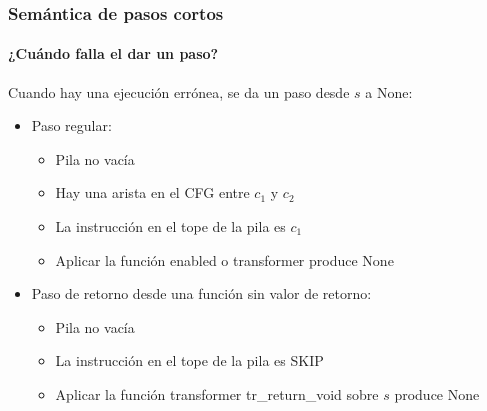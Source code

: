 \begin{frame}
\frametitle{Semántica de pasos cortos}
\framesubtitle{¿Cuándo falla el dar un paso?}

Cuando hay una ejecución errónea, se da un paso desde $s$ a None:
\begin{itemize}
\item{Paso regular:}
\begin{itemize}
\item{Pila no vacía}
\item{Hay una arista en el CFG entre $c_1$ y $c_2$}
\item{La instrucción en el tope de la pila es $c_1$}
\item{Aplicar la función enabled o transformer produce None}
\end{itemize}
\item{Paso de retorno desde una función sin valor de retorno:}
\begin{itemize}
\item{Pila no vacía}
\item{La instrucción en el tope de la pila es SKIP}
\item{Aplicar la función transformer tr\_return\_void sobre $s$ produce None}
\end{itemize}
\end{itemize}


\end{frame}



